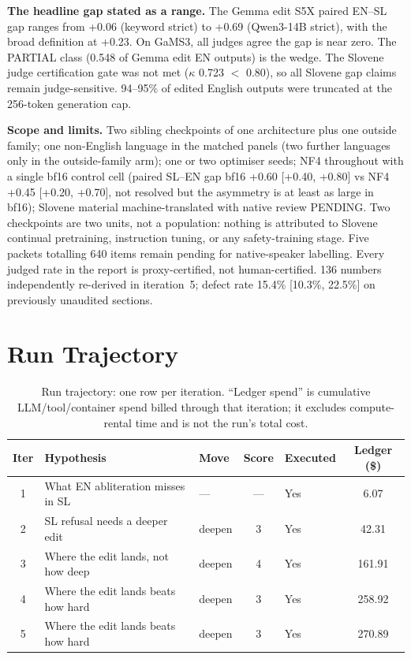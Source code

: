 \documentclass[11pt,letterpaper]{article}
\begin{document}
\textbf{The headline gap stated as a range.} The Gemma edit S5X paired EN--SL gap ranges from +0.06 (keyword strict) to +0.69 (Qwen3-14B strict), with the broad definition at +0.23. On GaMS3, all judges agree the gap is near zero. The PARTIAL class (0.548 of Gemma edit EN outputs) is the wedge. The Slovene judge certification gate was not met ($\kappa$ 0.723 $<$ 0.80), so all Slovene gap claims remain judge-sensitive. 94--95\% of edited English outputs were truncated at the 256-token generation cap.

\textbf{Scope and limits.} Two sibling checkpoints of one architecture plus one outside family; one non-English language in the matched panels (two further languages only in the outside-family arm); one or two optimiser seeds; NF4 throughout with a single bf16 control cell (paired SL--EN gap bf16 +0.60 [+0.40, +0.80] vs NF4 +0.45 [+0.20, +0.70], not resolved but the asymmetry is at least as large in bf16); Slovene material machine-translated with native review PENDING. Two checkpoints are two units, not a population: nothing is attributed to Slovene continual pretraining, instruction tuning, or any safety-training stage. Five packets totalling 640 items remain pending for native-speaker labelling. Every judged rate in the report is proxy-certified, not human-certified. 136 numbers independently re-derived in iteration~5; defect rate 15.4\% [10.3\%, 22.5\%] on previously unaudited sections.


\section{Run Trajectory}\label{sec:trajectory}

\begin{table}[!htbp]
\centering
\caption{Run trajectory: one row per iteration. ``Ledger spend'' is cumulative LLM/tool/container spend billed through that iteration; it excludes compute-rental time and is not the run's total cost.}
\label{tab:trajectory}
\small
\begin{tabular}{cllclc}
\toprule
Iter & Hypothesis & Move & Score & Executed & Ledger (\$) \\
\midrule
1 & What EN abliteration misses in SL & --- & --- & Yes & 6.07 \\
2 & SL refusal needs a deeper edit & deepen & 3 & Yes & 42.31 \\
3 & Where the edit lands, not how deep & deepen & 4 & Yes & 161.91 \\
4 & Where the edit lands beats how hard & deepen & 3 & Yes & 258.92 \\
5 & Where the edit lands beats how hard & deepen & 3 & Yes & 270.89 \\
\bottomrule
\end{tabular}
\end{table}
\end{document}
